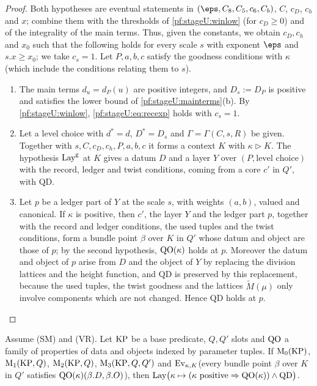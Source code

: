 \begin{proof}
Both hypotheses are eventual statements in $(\eps,C_8,C_5,c_6,C_b)$, $C$, $c_D$, $c_h$ and $x$; combine them with the
thresholds of \cref{pf:stageU:winlow} (for $c_D\ge0$) and of the integrality of the main terms. Thus, given the
constants, we obtain $c_D,c_h$ and $x_0$ such that the following holds for every scale $s$ with exponent $\eps$ and
$s.x\ge x_0$; we take $c_s=1$. Let $P,a,b,c$ satisfy the goodness conditions with $\kappa$ (which include the conditions
relating them to $s$).
\begin{enumerate}[label=\arabic*.]
\item The main terms $d_u=d_P(u)$ are positive integers, and $D_s:=D_P$ is positive and satisfies the lower bound of
\cref{pf:stageU:mainterms}(b). By \cref{pf:stageU:winlow}, \eqref{pf:stageU:eq:recexp} holds with $c_s=1$.
\item Let a level choice with $d^*=d$, $D^*=D_s$ and $\Gamma=\Gamma(C,s,R)$ be given. Together with $s,C,c_D,c_h,P,a,b,c$ it
forms a context $K$ with $\kappa\triangleright K$. The hypothesis $\mathrm{Lay}^{\mathrm g}$ at $K$ gives a datum $D$ and a layer $Y$
over $(P,\text{level choice})$ with the record, ledger and twist conditions, coming from a core $c'$ in $Q'$, with
$\mathrm{QD}$.
\item Let $p$ be a ledger part of $Y$ at the scale $s$, with weights $(a,b)$, valued and canonical. If $\kappa$ is positive,
then $c'$, the layer $Y$ and the ledger part $p$, together with the record and ledger conditions, the used tuples and the
twist conditions, form a bundle point $\beta$ over $K$ in $Q'$ whose datum and object are those of $p$; by the second
hypothesis, $\mathrm{QO}(\kappa)$ holds at $p$. Moreover the datum and object of $p$ arise from $D$ and the object of $Y$ by
replacing the division lattices and the height function, and $\mathrm{QD}$ is preserved by this replacement, because
the used tuples, the twist goodness and the lattices $\widetilde M(\mu)$ only involve components which are not changed.
Hence $\mathrm{QD}$ holds at $p$.
\end{enumerate}
\end{proof}

\begin{proposition}\label{pf:stageU:membertop}
Assume \textup{(SM)} and \textup{(VR)}. Let $\mathrm{KP}$ be a base predicate, $Q,Q'$ slots and $\mathrm{QO}$ a family of properties
of data and objects indexed by parameter tuples. If $\mathrm{M}_0(\mathrm{KP})$, $\mathrm{M}_1(\mathrm{KP},Q)$, $\mathrm{M}_2(\mathrm{KP},Q)$,
$\mathrm{M}_3(\mathrm{KP},Q,Q')$ and $\mathrm{Ev}_{\kappa,K}$(every bundle point $\beta$ over $K$ in $Q'$ satisfies
$\mathrm{QO}(\kappa)(\beta.D,\beta.O)$), then $\mathrm{Lay}\bigl(\kappa\mapsto(\kappa\text{ positive}\Rightarrow\mathrm{QO}(\kappa))\wedge\mathrm{QD}\bigr)$.
\end{proposition}

